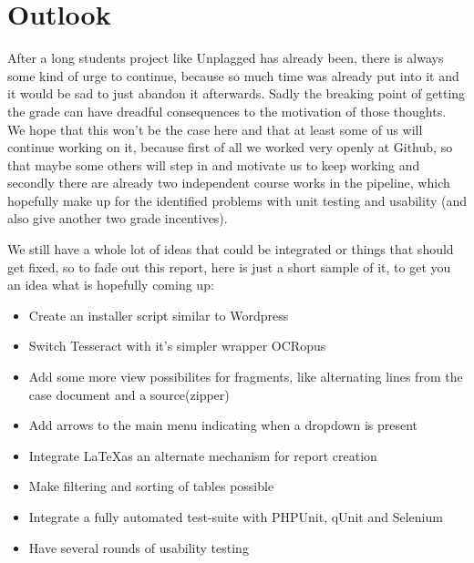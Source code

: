 \section{Outlook}

After a long students project like Unplagged has already been, there is always some kind of urge to continue, because so much time was already put into it and it would be sad to just abandon it afterwards. Sadly the breaking point of getting the grade can have dreadful consequences to the motivation of those thoughts. We hope that this won't be the case here and that at least some of us will continue working on it, because first of all we worked very openly at Github, so that maybe some others will step in and motivate us to keep working and secondly there are already two independent course works in the pipeline, which hopefully make up for the identified problems with unit testing and usability (and also give another two grade incentives).

We still have a whole lot of ideas that could be integrated or things that should get fixed, so to fade out this report, here is just a short sample of it, to get you an idea what is hopefully coming up:

\begin{itemize}
\item Create an installer script similar to Wordpress
\item Switch Tesseract with it's simpler wrapper OCRopus
\item Add some more view possibilites for fragments, like alternating lines from the case document and a source(zipper)
\item Add arrows to the main menu indicating when a dropdown is present
\item Integrate \LaTeX as an alternate mechanism for report creation
\item Make filtering and sorting of tables possible
\item Integrate a fully automated test-suite with PHPUnit, qUnit and Selenium
\item Have several rounds of usability testing
\end{itemize}